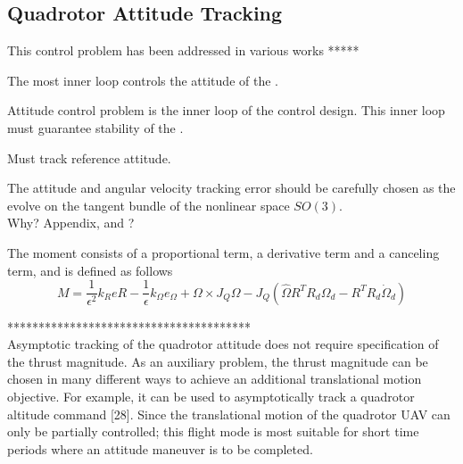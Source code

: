 \subsection{Quadrotor Attitude Tracking}

This control problem has been addressed in various works *****

The most inner loop controls the attitude of the .
\begin{figure}[h!]
	\centering
	\caption{\label{fig:con.qrattloop}}
\end{figure}		

Attitude control problem is the inner loop of the control design. This inner loop must guarantee stability of the .

Must track reference attitude.

The attitude and angular velocity tracking error should be carefully chosen as the evolve on the tangent bundle of the nonlinear space $ SO(3) $. \cite{Lee2010}\\
Why? Appendix\cite{Lee2010}, and \cite{Bullo2005}?

The moment consists of a proportional term, a derivative term and a canceling term, and is defined as follows
\begin{equation}\label{key}
M = \frac{1}{\epsilon^2}k_ReR-\frac{1}{\epsilon}k_\Omega e_\Omega+\Omega\times J_Q\Omega-J_Q(\hat{\Omega}R^TR_d\Omega_d-R^TR_d\dot{\Omega}_d)
\end{equation}

***************************************\\
Asymptotic tracking of the quadrotor attitude does not require specification of the thrust magnitude. As an auxiliary problem, the thrust magnitude can be chosen in many different ways to achieve an additional translational motion objective. For example, it can be used to asymptotically track a quadrotor altitude command [28]. Since the translational motion of the quadrotor UAV can only be partially controlled; this flight mode is most suitable for short time periods where an attitude maneuver is to be completed. \cite{Goodarzi2015b}

